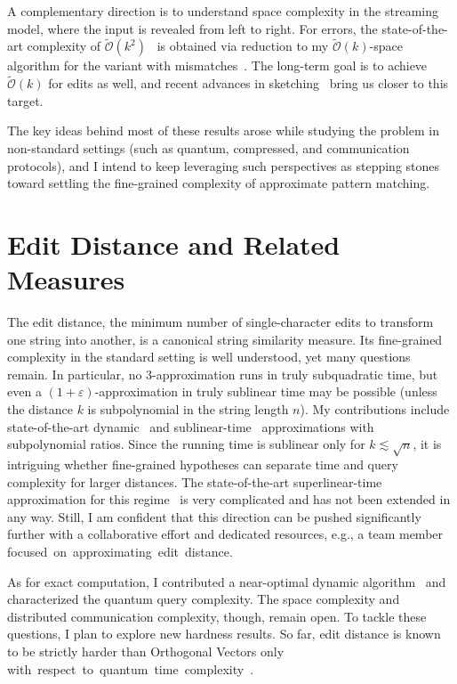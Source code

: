 \documentclass[a4paper,11pt]{article}
\newcommand{\eps}{\varepsilon}
\newcommand{\Ohtilde}{\tilde{\mathcal{O}}}
\begin{document}
A complementary direction is to understand space complexity in the streaming model, where the input is revealed from left to right. 
For errors, the state-of-the-art complexity of $\Ohtilde(k^2)$~\cite{BK23b} is obtained via reduction to my $\Ohtilde(k)$-space algorithm for the variant with mismatches~\cite{CKP19}. 
The long-term goal is to achieve $\Ohtilde(k)$ for edits as well, and recent advances in sketching~\cite{KS24} bring us closer to this target.  

The key ideas behind most of these results arose while studying the problem in non-standard settings (such as quantum, compressed, and communication protocols), and I intend to keep leveraging such perspectives as stepping stones toward settling the fine-grained complexity of approximate pattern matching.

\section{Edit Distance and Related Measures}

The edit distance, the minimum number of single-character edits to transform one string into another, is a canonical string similarity measure. 
Its fine-grained complexity in the standard setting is well understood, yet many questions remain. 
In particular, no $3$-approximation runs in truly subquadratic time, but even a $(1+\eps)$-approximation in truly sublinear time may be possible (unless the distance $k$ is subpolynomial in the string length $n$).
My contributions include state-of-the-art dynamic~\cite{KMS23} and sublinear-time~\cite{GKKS22} approximations with subpolynomial ratios. 
Since the running time is sublinear only for $k \lesssim \sqrt{n}$, it is intriguing whether fine-grained hypotheses can separate time and query complexity for larger distances.
The state-of-the-art superlinear-time approximation for this regime~\cite{AN20} is very complicated and has not been extended in any way.
Still, I am confident that this direction can be pushed significantly further with a collaborative effort and dedicated resources, e.g., a team member \mbox{focused on approximating edit distance}.

As for exact computation, I contributed a near-optimal dynamic algorithm~\cite{GK25} and characterized the quantum query complexity. 
The space complexity and distributed communication complexity, though, remain open. 
To tackle these questions, I plan to explore new hardness results.
So far, edit distance is known to be strictly harder than Orthogonal Vectors only \mbox{with respect to quantum time complexity~\cite{BPS21}}.
\end{document}
